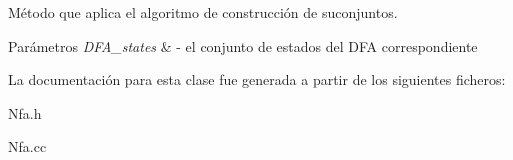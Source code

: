 Método que aplica el algoritmo de construcción de suconjuntos. 


\begin{DoxyParams}{Parámetros}
{\em D\+F\+A\+\_\+states} & -\/ el conjunto de estados del D\+FA correspondiente \\
\hline
\end{DoxyParams}


La documentación para esta clase fue generada a partir de los siguientes ficheros\+:\begin{DoxyCompactItemize}
\item 
Nfa.\+h\item 
Nfa.\+cc\end{DoxyCompactItemize}
